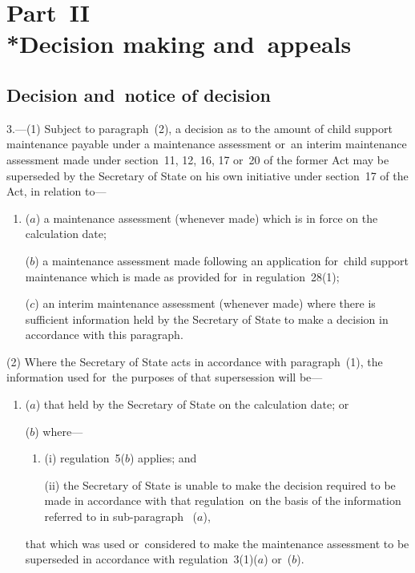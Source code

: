 \documentclass[12pt,a4paper]{article}
\begin{document}
\section[Part~II --- Decision making and~appeals]{Part~II\\*Decision making and~appeals}

\renewcommand\parthead{--- Part~II}

\subsection[3. Decision and~notice of decision]{Decision and~notice of decision}

3.---(1)  Subject to paragraph~(2), a decision as to the amount of child support maintenance payable under a maintenance assessment or~an interim maintenance assessment made under section~11, 12, 16, 17 or~20 of the former Act may be superseded by the Secretary of State on his own initiative under section~17 of the Act, in relation to—
\begin{enumerate}\item[]
($a$) a maintenance assessment (whenever made) which 
is in force on the calculation date;

($b$) a maintenance assessment made following an application for~child support maintenance which is made 
as provided for~in regulation~28(1);

($c$) an interim maintenance assessment 
(whenever made)  %
where there is sufficient information held by the Secretary of State to make a decision in accordance with this paragraph.
\end{enumerate}


(2) Where the Secretary of State acts in accordance with paragraph~(1), the information used for~the purposes of that supersession will be—
\begin{enumerate}\item[]
($a$) that held by the Secretary of State on the calculation date; or

($b$) where—
\begin{enumerate}\item[]
(i) regulation~5($b$)  applies; and

(ii) the Secretary of State is unable to make the decision required to be made in accordance with that regulation~on the basis of the information referred to in 
sub-paragraph~ %
($a$),
\end{enumerate}
that which was used or~considered to make the maintenance assessment to be superseded in accordance with regulation~3(1)($a$)  or~($b$).
\end{enumerate}
\end{document}

